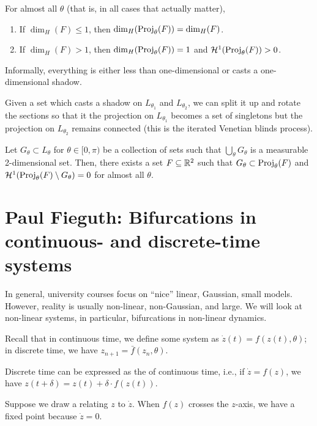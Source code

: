 \documentclass[class=pmath370,tikz,notes]{agony}
\begin{document}
\begin{theorem}
  For almost all $\theta$ (that is, in all cases that actually matter),
  \begin{enumerate}[nosep]
    \item If $\dim_H(F) \leq 1$, then $\dim_H(\operatorname{Proj}_\theta(F)) = \dim_H(F)$.
    \item If $\dim_H(F) > 1$, then $\dim_H(\operatorname{Proj}_\theta(F)) = 1$ and $\mathcal{H}^1(\operatorname{Proj}_\theta(F)) > 0$.
  \end{enumerate}
\end{theorem}

Informally, everything is either less than one-dimensional
or casts a one-dimensional shadow.

Given a set which casts a shadow on $L_{\theta_1}$ and $L_{\theta_2}$,
we can split it up and rotate the sections so that it the projection on $L_{\theta_1}$
becomes a set of singletons but the projection on $L_{\theta_2}$ remains connected
(this is the iterated Venetian blinds process).

\begin{theorem}
  Let $G_\theta \subset L_\theta$ for $\theta \in [0,\pi)$
  be a collection of sets such that $\bigcup_\theta G_\theta$
  is a measurable 2-dimensional set.
  Then, there exists a set $F \subseteq \mathbb{R}^2$ such that
  $G_\theta \subset \operatorname{Proj}_\theta(F)$ and $\mathcal{H}^1(\operatorname{Proj}_\theta(F) \setminus G_\theta) = 0$
  for almost all $\theta$.
\end{theorem}

\section{Paul Fieguth: Bifurcations in continuous- and discrete-time systems}

In general, university courses focus on ``nice'' linear, Gaussian, small models.
However, reality is usually non-linear, non-Gaussian, and large.
We will look at non-linear systems, in particular,
bifurcations in non-linear dynamics.

Recall that in continuous time, we define some system as $\dot z(t) = f(z(t),\theta)$;
in discrete time, we have $z_{n+1} = \bar f(z_n,\theta)$.

Discrete time can be expressed as the 
of continuous time, i.e., if $\dot z = f(z)$,
we have $z(t + \delta) = z(t) + \delta \cdot f(z(t))$.

Suppose we draw a  relating $z$ to $\dot z$.
When $f(z)$ crosses the $z$-axis, we have a fixed point because $\dot z = 0$.
\end{document}
